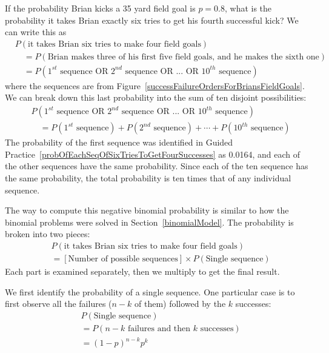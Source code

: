 If the probability Brian kicks a 35 yard field goal is $p=0.8$, what is the probability it takes Brian exactly six tries to get his fourth successful kick? We can write this as
{\small\begin{align*}
&P(\text{it takes Brian six tries to make four field goals}) \\
& \quad = P(\text{Brian makes three of his first five field goals, and he makes the sixth one}) \\
& \quad = P(\text{$1^{st}$ sequence OR $2^{nd}$ sequence OR ... OR $10^{th}$ sequence})
\end{align*}
}where the sequences are from Figure~\ref{successFailureOrdersForBriansFieldGoals}. We can break down this last probability into the sum of ten disjoint possibilities:
{\small\begin{align*}
&P(\text{$1^{st}$ sequence OR $2^{nd}$ sequence OR ... OR $10^{th}$ sequence}) \\
&\quad = P(\text{$1^{st}$ sequence}) + P(\text{$2^{nd}$ sequence}) + \cdots + P(\text{$10^{th}$ sequence})
\end{align*}
}The probability of the first sequence was identified in Guided Practice~\ref{probOfEachSeqOfSixTriesToGetFourSuccesses} as 0.0164, and each of the other sequences have the same probability. Since each of the ten sequence has the same probability, the total probability is ten times that of any individual sequence.

The way to compute this negative binomial probability is similar to how the binomial problems were solved in Section~\ref{binomialModel}. The probability is broken into two pieces:
\begin{align*}
&P(\text{it takes Brian six tries to make four field goals}) \\
&= [\text{Number of possible sequences}] \times P(\text{Single sequence})
\end{align*}
Each part is examined separately, then we multiply to get the final result.

We first identify the probability of a single sequence. One particular case is to first observe all the failures ($n-k$ of them) followed by the $k$ successes:
\begin{align*}
&P(\text{Single sequence}) \\
&= P(\text{$n-k$ failures and then $k$ successes}) \\
&= (1-p)^{n-k} p^{k}
\end{align*}

\D{\newpage}

